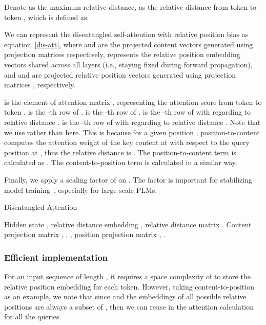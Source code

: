 \documentclass{article}
\def\eqref#1{equation~\ref{#1}}
\begin{document}
Denote  as the maximum relative distance,
 as the relative distance from token  to token , which is defined as:


We can represent the disentangled self-attention with relative position bias as \eqref{dis-att}, 
where  and   are the projected content vectors generated using projection matrices  respectively, 
 represents the relative position embedding vectors shared across all layers (i.e., staying fixed during forward propagation), 
and  and  are projected relative position vectors generated using projection matrices , respectively.   





 is the element of attention matrix , representing the attention score from token  to token . 
 is the -th row of .  is the -th row of . 
 is the -th row of  with regarding to relative distance .
 is the -th row of  with regarding to relative distance . 
Note that we use  rather than  here. This is because for a given position , position-to-content computes the attention weight of the key content at  with respect to the query position at , thus the relative distance is . 
The position-to-content term is calculated as .
The content-to-position term is calculated in a similar way.

Finally, we apply a scaling factor of  on .
The factor is important for stabilizing model training~\citep{vaswani2017attention}, especially for large-scale PLMs. 




\begin{algorithm}[H]
\caption{Disentangled Attention}
\label{DA}
\begin{algorithmic}[1]
    \INPUT Hidden state , relative distance embedding , relative distance matrix .
    Content projection matrix , , ,
    position projection matrix , . 

    \State {, , ,   , }
    \State {} 
    \For{} 
        \State {} 
    \EndFor
    \For {}
        \For {}
        \State {} 
        \EndFor
    \EndFor
    \For{}
        \State {} 
    \EndFor
    \For {}
        \For {}
        \State {} 
        \EndFor
    \EndFor
    \State {}
    \State {}
    \OUTPUT 
 \end{algorithmic}

\end{algorithm}
\subsubsection{Efficient implementation}
For an input sequence of length , it requires a space complexity of  \citep{shaw2018self,huang2018music,dai2019transformer} to store the relative position embedding for each token. 
However, taking content-to-position as an example, we note that since  and the embeddings of all possible relative positions are always a subset of , then we can reuse  in the attention calculation for all the queries.
\end{document}

